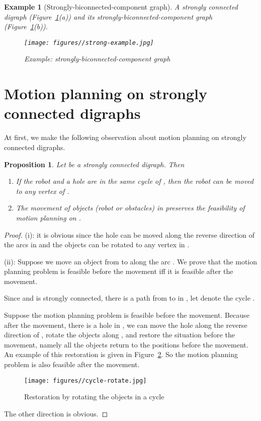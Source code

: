 \documentclass{article}
\newtheorem{prop}[thm]{Proposition}
\newtheorem{exmp}[thm]{Example}
\begin{document}
\begin{exmp}[Strongly-biconnected-component graph]
A strongly connected digraph 
(Figure~\ref{fig:strong-example}(a)) and its
strongly-biconnected-component graph 
(Figure~\ref{fig:strong-example}(b)).

\begin{figure}[ht]
\centering
  \texttt{[image: figures//strong-example.jpg]}
  \caption{Example: strongly-biconnected-component graph}\label{fig:strong-example}
\end{figure}
\end{exmp}



\section{Motion planning on strongly connected digraphs}\label{sec:strong-algo}

At first, we make the following observation about motion planning on
strongly connected digraphs.

\begin{prop}\label{prop:motion-strong-observ}
Let  be a strongly connected digraph. Then
\begin{enumerate}
\item If the robot and a hole are in the same cycle  of , then the robot can be moved to any vertex of .

\item The movement of objects (robot or obstacles) in  preserves the feasibility of motion
planning on .
\end{enumerate}
\end{prop}
\begin{proof}

\noindent (i): it is obvious since the hole can be moved along the
reverse direction of the arcs in  and the objects can be rotated
to any vertex in .

\noindent (ii): Suppose we move an object from  to  along the
arc . We prove that the motion planning problem is
feasible before the movement iff it is feasible after the movement.

Since  and  is strongly connected, there is a path
 from  to  in , let  denote the cycle .

Suppose the motion planning problem is feasible before the movement.
Because after the movement, there is a hole in , we can move the
hole along the reverse direction of , rotate the objects along
, and restore the situation before the movement, namely all the
objects return to the positions before the movement. An example of
this restoration is given in Figure~\ref{fig:cycle-rotate}. So the
motion planning problem is also feasible after the movement.

\begin{figure}[ht]
\centering
  \texttt{[image: figures//cycle-rotate.jpg]}
  \caption{Restoration by rotating the objects in a cycle}\label{fig:cycle-rotate}
\end{figure}

The other direction is obvious.
\end{proof}
\end{document}
